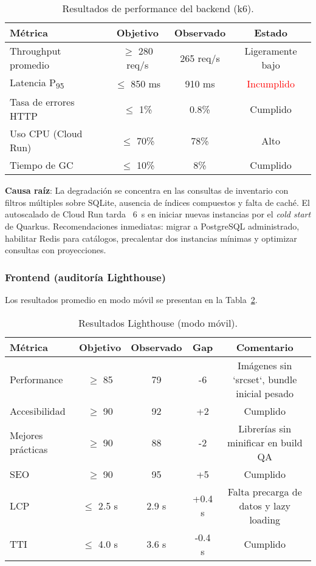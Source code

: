 \documentclass[12pt,a4paper]{article}
\begin{document}
\begin{table}[htbp]
    \centering
    \caption{Resultados de performance del backend (k6).}\label{tab:backend-performance}
    \begin{tabular}{lccc}
        \toprule
        Métrica & Objetivo & Observado & Estado \\
        \midrule
        Throughput promedio & $\geq$ 280 req/s & 265 req/s & \textcolor{naranjaAlerta}{Ligeramente bajo} \\
        Latencia P\textsubscript{95} & $\leq$ 850 ms & 910 ms & \textcolor{red}{Incumplido} \\
        Tasa de errores HTTP & $\leq$ 1\% & 0.8\% & \textcolor{verdeOk}{Cumplido} \\
        Uso CPU (Cloud Run) & $\leq$ 70\% & 78\% & \textcolor{naranjaAlerta}{Alto} \\
        Tiempo de GC & $\leq$ 10\% & 8\% & \textcolor{verdeOk}{Cumplido} \\
        \bottomrule
    \end{tabular}
\end{table}

\textbf{Causa raíz}: La degradación se concentra en las consultas de inventario con filtros múltiples sobre SQLite, ausencia de índices compuestos y falta de caché. El autoscalado de Cloud Run tarda ~6~s en iniciar nuevas instancias por el \emph{cold start} de Quarkus. Recomendaciones inmediatas: migrar a PostgreSQL administrado, habilitar Redis para catálogos, precalentar dos instancias mínimas y optimizar consultas con proyecciones.

\subsubsection{Frontend (auditoría Lighthouse)}

Los resultados promedio en modo móvil se presentan en la Tabla~\ref{tab:lighthouse-fase3}.

\begin{table}[htbp]
    \centering
    \caption{Resultados Lighthouse (modo móvil).}\label{tab:lighthouse-fase3}
    \begin{tabular}{lcccc}
        \toprule
        Métrica & Objetivo & Observado & Gap & Comentario \\
        \midrule
        Performance & $\geq$ 85 & 79 & -6 & Imágenes sin `srcset`, bundle inicial pesado \\
        Accesibilidad & $\geq$ 90 & 92 & +2 & Cumplido \\
        Mejores prácticas & $\geq$ 90 & 88 & -2 & Librerías sin minificar en build QA \\
        SEO & $\geq$ 90 & 95 & +5 & Cumplido \\
        LCP & $\leq$ 2.5 s & 2.9 s & +0.4 s & Falta precarga de datos y lazy loading \\
        TTI & $\leq$ 4.0 s & 3.6 s & -0.4 s & Cumplido \\
        \bottomrule
    \end{tabular}
\end{table}
\end{document}
